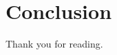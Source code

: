 \documentclass[./mainBiblatex]{subfiles}
\begin{document}
\section{Conclusion}
Thank you for reading.

\end{document}
